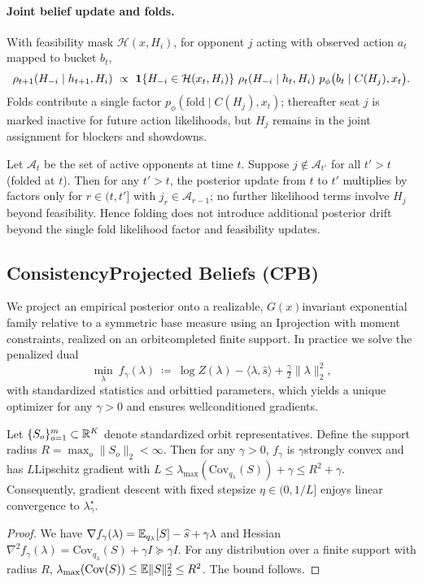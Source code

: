 \paragraph{Joint belief update and folds.}
With feasibility mask $\mathcal{H}(x,H_i)$, for opponent $j$ acting with observed action $a_t$ mapped to bucket $b_t$,
\[
\rho_{t+1}(H_{-i}\mid h_{t+1},H_i)\ \propto\ \1\{H_{-i}\in\mathcal{H}(x_t,H_i)\}\ \rho_t(H_{-i}\mid h_t,H_i)\ p_\phi\big(b_t\mid C(H_j),x_t\big).
\]
Folds contribute a single factor $p_\phi(\mathrm{fold}\mid C(H_j),x_t)$; thereafter seat $j$ is marked inactive for future action likelihoods, but $H_j$ remains in the joint assignment for blockers and showdowns.

\begin{proposition}
Let $\mathcal{A}_t$ be the set of active opponents at time $t$. Suppose $j\notin\mathcal{A}_{t'}$ for all $t'>t$ (folded at $t$). Then for any $t'>t$, the posterior update from $t$ to $t'$ multiplies by factors only for $r\in(t,t']$ with $j_r\in \mathcal{A}_{r-1}$; no further likelihood terms involve $H_j$ beyond feasibility. Hence folding does not introduce additional posterior drift beyond the single fold likelihood factor and feasibility updates.
\end{proposition}

\subsection{Consistency\textendash Projected Beliefs (CPB)}
We project an empirical posterior onto a realizable, $G(x)$\textendash invariant exponential family relative to a symmetric base measure using an I\textendash projection with moment constraints, realized on an orbit\textendash completed finite support. In practice we solve the penalized dual
\[
\min_{\lambda}\ f_\gamma(\lambda)\ \coloneqq\ \log Z(\lambda) - \langle \lambda,\widehat s\rangle + \tfrac{\gamma}{2}\|\lambda\|_2^2,
\]
with standardized statistics and orbit\textendash tied parameters, which yields a unique optimizer for any $\gamma>0$ and ensures well\textendash conditioned gradients.

\begin{theorem}\label{thm:cpb-strong}
Let $\{S_o\}_{o=1}^m\subset\mathbb{R}^K$ denote standardized orbit representatives. Define the support radius $R=\max_o \|S_o\|_2<\infty$. Then for any $\gamma>0$, $f_\gamma$ is $\gamma$\textendash strongly convex and has $L$\textendash Lipschitz gradient with
$
L \le \lambda_{\max}(\mathrm{Cov}_{q_\lambda}(S))+\gamma \le R^2+\gamma.
$
Consequently, gradient descent with fixed stepsize $\eta\in(0,1/L]$ enjoys linear convergence to $\lambda_\gamma^\star$.
\end{theorem}
\begin{proof}
We have $\nabla f_\gamma(\lambda)=\mathbb{E}_{q_\lambda}[S]-\widehat s+\gamma\lambda$ and Hessian $\nabla^2 f_\gamma(\lambda)=\mathrm{Cov}_{q_\lambda}(S)+\gamma I\succeq \gamma I$. For any distribution over a finite support with radius $R$, $\lambda_{\max}(\mathrm{Cov}(S))\le \mathbb{E}\|S\|_2^2 \le R^2$. The bound follows.
\end{proof}

